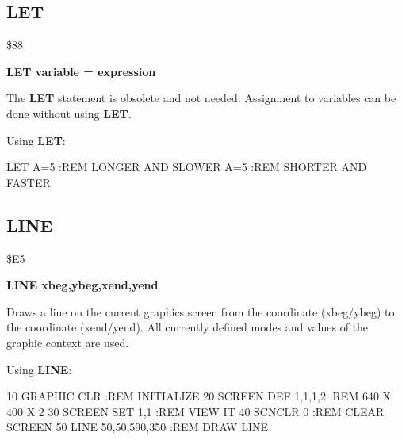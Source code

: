 
\newpage
\subsection{LET}
\begin{description}[leftmargin=3cm,style=nextline]
\item [Token:] \$88
\item [Format:] {\bf LET variable = expression}
\item [Usage:] The {\bf LET} statement is obsolete and not needed.
               Assignment to variables can be done without using
               {\bf LET}.

\item [Example:] Using {\bf LET}:
\begin{screenoutput}
LET A=5  :REM LONGER  AND SLOWER
A=5      :REM SHORTER AND FASTER
\end{screenoutput}
\end{description}


\newpage
\subsection{LINE}
\begin{description}[leftmargin=3cm,style=nextline]
\item [Token:] \$E5
\item [Format:] {\bf LINE xbeg,ybeg,xend,yend}
\item [Usage:] Draws a line on the current
               graphics screen from the coordinate (xbeg/ybeg) to
               the coordinate (xend/yend). All currently defined
               modes and values of the graphic context are used.

\item [Example:] Using {\bf LINE}:
\begin{screenoutput}
 10 GRAPHIC CLR         :REM INITIALIZE
 20 SCREEN DEF 1,1,1,2  :REM 640 X 400 X 2
 30 SCREEN SET 1,1      :REM VIEW IT
 40 SCNCLR 0            :REM CLEAR SCREEN
 50 LINE 50,50,590,350  :REM DRAW LINE
\end{screenoutput}
\end{description}


\newpage
